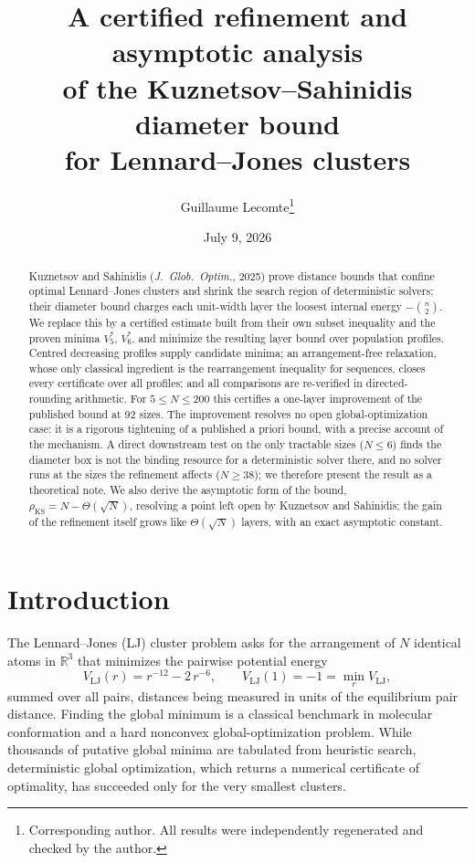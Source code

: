 \documentclass[11pt]{article}
\title{A certified refinement and asymptotic analysis\\
of the Kuznetsov--Sahinidis diameter bound\\
for Lennard--Jones clusters}
\author{Guillaume Lecomte\thanks{Corresponding author. All results were independently regenerated and checked by the author.}}
\date{July 9, 2026}
\theoremstyle{remark}
\newcommand{\KS}{\mathrm{KS}}
\begin{document}
\maketitle

\begin{abstract}
Kuznetsov and Sahinidis (\emph{J.\ Glob.\ Optim.}, 2025) prove distance bounds that confine optimal Lennard--Jones clusters and shrink the search region of deterministic solvers; their diameter bound charges each unit-width layer the loosest internal energy $-\binom n2$. We replace this by a certified estimate built from their own subset inequality and the proven minima $V^*_5$, $V^*_6$, and minimize the resulting layer bound over population profiles. Centred decreasing profiles supply candidate minima; an arrangement-free relaxation, whose only classical ingredient is the rearrangement inequality for sequences, closes every certificate over all profiles; and all comparisons are re-verified in directed-rounding arithmetic. For $5\le N\le 200$ this certifies a one-layer improvement of the published bound at 92 sizes. The improvement resolves no open global-optimization case: it is a rigorous tightening of a published a priori bound, with a precise account of the mechanism. A direct downstream test on the only tractable sizes ($N\le 6$) finds the diameter box is not the binding resource for a deterministic solver there, and no solver runs at the sizes the refinement affects ($N\ge 38$); we therefore present the result as a theoretical note. We also derive the asymptotic form of the bound, $\rho_\KS = N-\Theta(\sqrt N)$, resolving a point left open by Kuznetsov and Sahinidis; the gain of the refinement itself grows like $\Theta(\sqrt N)$ layers, with an exact asymptotic constant.
\end{abstract}

\section{Introduction}\label{sec:intro}

The Lennard--Jones (LJ) cluster problem asks for the arrangement of $N$ identical atoms in $\mathbb R^3$ that minimizes the pairwise potential energy
\begin{equation}\label{eq:pot}
V_{\mathrm{LJ}}(r) = r^{-12} - 2\,r^{-6}, \qquad V_{\mathrm{LJ}}(1) = -1 = \min_r V_{\mathrm{LJ}},
\end{equation}
summed over all pairs, distances being measured in units of the equilibrium pair distance. Finding the global minimum is a classical benchmark in molecular conformation and a hard nonconvex global-optimization problem. While thousands of putative global minima are tabulated from heuristic search, deterministic global optimization, which returns a numerical certificate of optimality, has succeeded only for the very smallest clusters.
\end{document}
